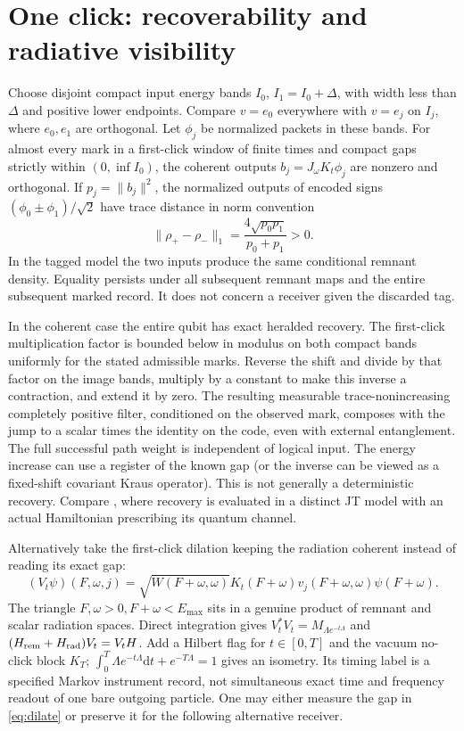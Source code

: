 \documentclass[11pt]{article}
\newcommand{\dd}{\mathrm d}
\begin{document}
\section{One click: recoverability and radiative visibility}
Choose disjoint compact input energy bands \(I_0\), \(I_1=I_0+\Delta\), with width less than \(\Delta\) and positive lower endpoints. Compare \(v=e_0\) everywhere with \(v=e_j\) on \(I_j\), where \(e_0,e_1\) are orthogonal. Let \(\phi_j\) be normalized packets in these bands. For almost every mark in a first-click window of finite times and compact gaps strictly within \((0,\inf I_0)\), the coherent outputs \(b_j=J_\omega K_t\phi_j\) are nonzero and orthogonal. If \(p_j=\|b_j\|^2\), the normalized outputs of encoded signs \((\phi_0\pm\phi_1)/\sqrt2\) have trace distance in norm convention
\[
 \|\rho_+-\rho_-\|_1=\frac{4\sqrt{p_0p_1}}{p_0+p_1}>0.
\]
In the tagged model the two inputs produce the same conditional remnant density. Equality persists under all subsequent remnant maps and the entire subsequent marked record. It does not concern a receiver given the discarded tag.

In the coherent case the entire qubit has exact heralded recovery. The first-click multiplication factor is bounded below in modulus on both compact bands uniformly for the stated admissible marks. Reverse the shift and divide by that factor on the image bands, multiply by a constant to make this inverse a contraction, and extend it by zero. The resulting measurable trace-nonincreasing completely positive filter, conditioned on the observed mark, composes with the jump to a scalar times the identity on the code, even with external entanglement. The full successful path weight is independent of logical input. The energy increase can use a register of the known gap (or the inverse can be viewed as a fixed-shift covariant Kraus operator). This is not generally a deterministic recovery. Compare \cite{paper03}, where recovery is evaluated in a distinct JT model with an actual Hamiltonian prescribing its quantum channel.

Alternatively take the first-click dilation keeping the radiation coherent instead of reading its exact gap:
\begin{equation}
 (V_t\psi)(F,\omega,j)
 =\sqrt{W(F+\omega,\omega)}K_t(F+\omega)
                  v_j(F+\omega,\omega)\psi(F+\omega).             \label{eq:dilate}
\end{equation}
The triangle \(F,\omega>0,F+\omega<E_{\max}\) sits in a genuine product of remnant and scalar radiation spaces. Direct integration gives \(V_t^*V_t=M_{\Lambda e^{-t\Lambda}}\) and \((H_{\rm rem}+H_{\rm rad})V_t=V_tH\). Add a Hilbert flag for \(t\in[0,T]\) and the vacuum no-click block \(K_T\); \(\int_0^T\Lambda e^{-t\Lambda}\dd t+e^{-T\Lambda}=1\) gives an isometry. Its timing label is a specified Markov instrument record, not simultaneous exact time and frequency readout of one bare outgoing particle. One may either measure the gap in \eqref{eq:dilate} or preserve it for the following alternative receiver.
\end{document}
